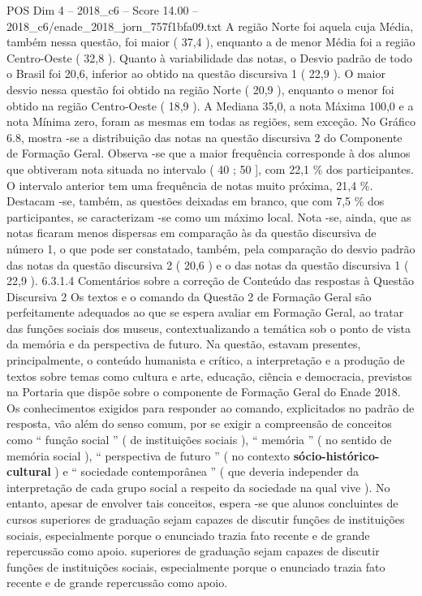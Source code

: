 \begin{textsample}{POS Dim 4 – 2018\_c6 – Score 14.00 – 2018\_c6/enade\_2018\_jorn\_757f1bfa09.txt}
A região Norte foi aquela cuja Média, também nessa questão, foi maior ( 37,4 ), enquanto a de menor Média foi a região Centro-Oeste ( 32,8 ).
Quanto à variabilidade das notas, o Desvio padrão de todo o Brasil foi 20,6, inferior ao obtido na questão discursiva 1 ( 22,9 ).
O maior desvio nessa questão foi obtido na região Norte ( 20,9 ), enquanto o menor foi obtido na região Centro-Oeste ( 18,9 ).
A Mediana 35,0, a nota Máxima 100,0 e a nota Mínima zero, foram as mesmas em todas as regiões, sem exceção.
No Gráfico 6.8, mostra -se a distribuição das notas na questão discursiva 2 do Componente de Formação Geral.
Observa -se que a maior frequência corresponde à dos alunos que obtiveram nota situada no intervalo ( 40 ; 50 ], com 22,1 \% dos participantes.
O intervalo anterior tem uma frequência de notas muito próxima, 21,4 \%.
Destacam -se, também, as questões deixadas em branco, que com 7,5 \% dos participantes, se caracterizam -se como um máximo local.
Nota -se, ainda, que as notas ficaram menos dispersas em comparação às da questão discursiva de número 1, o que pode ser constatado, também, pela comparação do desvio padrão das notas da questão discursiva 2 ( 20,6 ) e o das notas da questão discursiva 1 ( 22,9 ). 6.3.1.4 Comentários sobre a correção de Conteúdo das respostas à Questão Discursiva 2 Os textos e o comando da Questão 2 de Formação Geral são perfeitamente adequados ao que se espera avaliar em Formação Geral, ao tratar das funções sociais dos museus, contextualizando a temática sob o ponto de vista da memória e da perspectiva de futuro.
Na questão, estavam presentes, principalmente, o conteúdo humanista e crítico, a interpretação e a produção de textos sobre temas como cultura e arte, educação, ciência e democracia, previstos na Portaria que dispõe sobre o componente de Formação Geral do Enade 2018.
Os conhecimentos exigidos para responder ao comando, explicitados no padrão de resposta, vão além do senso comum, por se exigir a compreensão de conceitos como “ função social ” ( de instituições sociais ), “ memória ” ( no sentido de memória social ), “ perspectiva de futuro ” ( no contexto \textbf{sócio-histórico-cultural} ) e “ sociedade contemporânea ” ( que deveria independer da interpretação de cada grupo social a respeito da sociedade na qual vive ).
No entanto, apesar de envolver tais conceitos, espera -se que alunos concluintes de cursos superiores de graduação sejam capazes de discutir funções de instituições sociais, especialmente porque o enunciado trazia fato recente e de grande repercussão como apoio. superiores de graduação sejam capazes de discutir funções de instituições sociais, especialmente porque o enunciado trazia fato recente e de grande repercussão como apoio.

\end{textsample}
